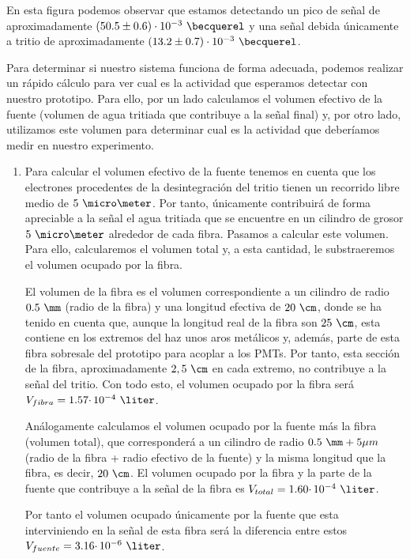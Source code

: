 En esta figura podemos observar que estamos detectando un pico de señal de aproximadamente $(50.5 \pm 0.6) \cdot 10^{-3}~\becquerel$ y una señal debida únicamente a tritio de aproximadamente $(13.2 \pm 0.7) \cdot 10^{-3}~\becquerel$. 

Para determinar si nuestro sistema funciona de forma adecuada, podemos realizar un rápido cálculo para ver cual es la actividad que esperamos detectar con nuestro prototipo. Para ello, por un lado calculamos el volumen efectivo de la fuente (volumen de agua tritiada que  contribuye a la señal final) y, por otro lado, utilizamos este volumen para determinar cual es la actividad que deberíamos medir en nuestro experimento.

\begin{enumerate}
 \item{} Para calcular el volumen efectivo de la fuente tenemos en cuenta que los electrones procedentes de la desintegración del tritio tienen un recorrido libre medio de $5~\micro\meter$. Por tanto, únicamente contribuirá de forma apreciable a la señal el agua tritiada que se encuentre en  un cilindro de grosor $5~\micro\meter$ alrededor de cada fibra. Pasamos a calcular este volumen. Para ello, calcularemos el volumen total y, a esta cantidad, le substraeremos el volumen ocupado por la fibra.

El volumen de la fibra es el volumen correspondiente a un cilindro de radio $0.5~\mm$ (radio de la fibra) y una longitud efectiva de $20~\cm$, donde se ha tenido en cuenta que, aunque la longitud real de la fibra son $25~\cm$, esta contiene en los extremos del haz unos aros metálicos y, además, parte de esta fibra sobresale del prototipo para acoplar a los PMTs. Por tanto, esta sección de la fibra, aproximadamente $2,5~\cm$ en cada extremo,  no contribuye a la señal del tritio. Con todo esto, el volumen ocupado por la fibra será $V_{fibra}=1.57 \cdotp 10^{-4}~\liter$.

Análogamente calculamos el volumen ocupado por la fuente más la fibra (volumen total), que corresponderá a un cilindro de radio $0.5~\mm+5\mu m$ (radio de la fibra + radio efectivo de la fuente) y la misma longitud que la fibra, es decir, $20~\cm$. El volumen ocupado por la fibra y la parte de la fuente que contribuye a la señal de la fibra es $V_{total}=1.60 \cdotp 10^{-4}~\liter$. 

Por tanto el volumen ocupado únicamente por la fuente que esta interviniendo en la señal de esta fibra será la diferencia entre estos $V_{fuente}=3.16 \cdotp 10^{-6}~\liter$.
 

\end{enumerate}
